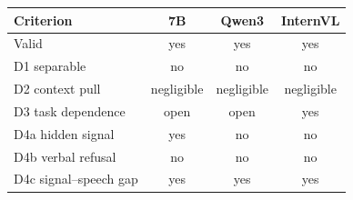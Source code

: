 \begin{tabular}{@{}lccc@{}}
\toprule
Criterion & 7B & Qwen3 & InternVL \\
\midrule
Valid & yes & yes & yes \\
D1 separable & no & no & no \\
D2 context pull & negligible & negligible & negligible \\
D3 task dependence & open & open & yes \\
D4a hidden signal & yes & no & no \\
D4b verbal refusal & no & no & no \\
D4c signal--speech gap & yes & yes & yes \\
\bottomrule
\end{tabular}
